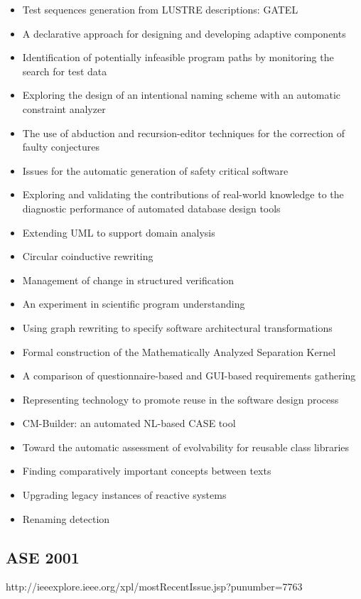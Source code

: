 {\begin{itemize}[itemsep=-1ex]
  \item Test sequences generation from LUSTRE descriptions: GATEL
  \item A declarative approach for designing and developing adaptive components
  \item Identification of potentially infeasible program paths by monitoring the search for test data
  \item Exploring the design of an intentional naming scheme with an automatic constraint analyzer
  \item The use of abduction and recursion-editor techniques for the correction of faulty conjectures
  \item Issues for the automatic generation of safety critical software
  \item Exploring and validating the contributions of real-world knowledge to the diagnostic performance of automated database design tools
  \item Extending UML to support domain analysis
  \item Circular coinductive rewriting
  \item Management of change in structured verification
  \item An experiment in scientific program understanding
  \item Using graph rewriting to specify software architectural transformations
  \item Formal construction of the Mathematically Analyzed Separation Kernel
  \item A comparison of questionnaire-based and GUI-based requirements gathering
  \item Representing technology to promote reuse in the software design process
  \item CM-Builder: an automated NL-based CASE tool
  \item Toward the automatic assessment of evolvability for reusable class libraries
  \item Finding comparatively important concepts between texts
  \item Upgrading legacy instances of reactive systems
  \item Renaming detection 
\end{itemize}
}

\subsection{ASE 2001}

http://ieeexplore.ieee.org/xpl/mostRecentIssue.jsp?punumber=7763

